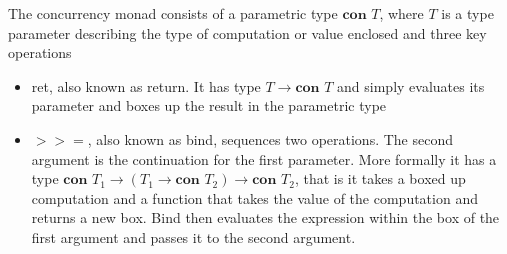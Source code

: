 \documentclass[12pt,twoside,notitlepage]{report}
\begin{document}
 The concurrency monad consists of a parametric type $  \textbf{con } T  $, where $ T $ is a type parameter describing the type of computation or value enclosed and three key operations 
\begin{itemize}
\item{ret, also known as return. It has type $ T \rightarrow \textbf{con }T   $ and simply evaluates its parameter and boxes up the result in the parametric type}
\item{$>>=$, also known as bind, sequences two operations. The second argument is the continuation for the first parameter. More formally it has a type $ \textbf{con } T_1  \rightarrow ( T_1 \rightarrow \textbf{con } T_2 ) \rightarrow \textbf{con } T_2  $, that is it takes a boxed up computation and a function that takes the value of the computation and returns a new box. Bind then evaluates the expression within the box of the first argument and passes it to the second argument.}

\end{itemize}
\end{document}
